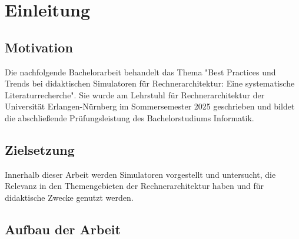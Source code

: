 \chapter{Einleitung}

\section{Motivation}

Die nachfolgende Bachelorarbeit behandelt das Thema "Best Practices und Trends bei didaktischen Simulatoren für Rechnerarchitektur: Eine systematische Literaturrecherche". Sie wurde am Lehrstuhl für Rechnerarchitektur der Universität Erlangen-Nürnberg im Sommersemester 2025 geschrieben und bildet die abschließende Prüfungsleistung des Bachelorstudiums Informatik.



\section{Zielsetzung}

Innerhalb dieser Arbeit werden Simulatoren vorgestellt und untersucht, die Relevanz in den Themengebieten der Rechnerarchitektur haben und für didaktische Zwecke genutzt werden.

\section{Aufbau der Arbeit}

